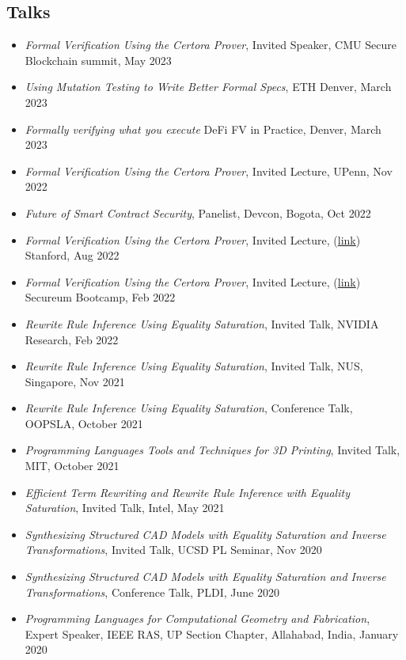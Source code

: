 \documentclass[margin, 10pt]{res} %
\begin{document}
\begin{resume}
\section{Talks}
 \begin{itemize}[itemsep=.7pt]
 \item{\sl Formal Verification Using the Certora Prover}, Invited Speaker, CMU Secure Blockchain summit, May 2023
 \item{\sl Using Mutation Testing to Write Better Formal Specs}, ETH Denver, March 2023
 \item{\sl Formally verifying what you execute} DeFi FV in Practice, Denver, March 2023
 \item{\sl Formal Verification Using the Certora Prover}, Invited Lecture, UPenn, Nov 2022
 \item{\sl Future of Smart Contract Security}, Panelist, Devcon, Bogota, Oct 2022
 \item {\sl Formal Verification Using the Certora Prover}, Invited Lecture,
   (\href{https://www.certora.com/events/certora-prover-2-day-workshop/}{link})
   Stanford, Aug 2022
 \item {\sl Formal Verification Using the Certora Prover}, Invited Lecture,
   (\href{https://github.com/Certora/Tutorials/tree/master/05.Lesson_GettingFamiliarWithCVT}{link})
   Secureum Bootcamp, Feb 2022
 \item {\sl Rewrite Rule Inference Using Equality Saturation}, Invited Talk, NVIDIA Research, Feb 2022
 \item {\sl Rewrite Rule Inference Using Equality Saturation}, Invited Talk, NUS, Singapore, Nov 2021
 \item {\sl Rewrite Rule Inference Using Equality Saturation}, Conference Talk, OOPSLA, October 2021
 \item {\sl Programming Languages Tools and Techniques for 3D Printing}, Invited Talk, MIT, October 2021
 \item {\sl Efficient Term Rewriting and Rewrite Rule Inference with Equality Saturation}, Invited Talk, Intel, May 2021
 \item {\sl Synthesizing Structured CAD Models with Equality Saturation and Inverse Transformations}, Invited Talk, UCSD PL Seminar, Nov 2020
 \item {\sl Synthesizing Structured CAD Models with Equality Saturation and Inverse Transformations}, Conference Talk, PLDI, June 2020
 \item {\sl Programming Languages for Computational Geometry and Fabrication}, Expert Speaker, IEEE RAS, UP Section Chapter, Allahabad, India, January 2020

\end{itemize}
\end{resume}
\end{document}
